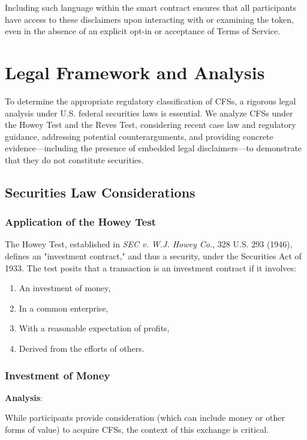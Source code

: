 \documentclass[a4paper,12pt]{article}
\begin{document}
Including such language within the smart contract ensures that all participants have access to these disclaimers upon interacting with or examining the token, even in the absence of an explicit opt-in or acceptance of Terms of Service.

\section{Legal Framework and Analysis}
To determine the appropriate regulatory classification of CFSs, a rigorous legal analysis under U.S. federal securities laws is essential. We analyze CFSs under the Howey Test and the Reves Test, considering recent case law and regulatory guidance, addressing potential counterarguments, and providing concrete evidence—including the presence of embedded legal disclaimers—to demonstrate that they do not constitute securities.

\subsection{Securities Law Considerations}

\subsubsection{Application of the Howey Test}
The Howey Test, established in \emph{SEC v. W.J. Howey Co.}, 328 U.S. 293 (1946), defines an "investment contract," and thus a security, under the Securities Act of 1933. The test posits that a transaction is an investment contract if it involves:

\begin{enumerate}[label=\arabic*)]
 \item An investment of money,
 \item In a common enterprise,
 \item With a reasonable expectation of profits,
 \item Derived from the efforts of others.
\end{enumerate}

\subsubsection{Investment of Money}
\textbf{Analysis}: 

While participants provide consideration (which can include money or other forms of value) to acquire CFSs, the context of this exchange is critical.
\end{document}
